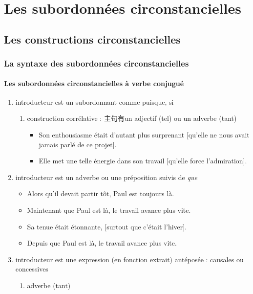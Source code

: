 \documentclass[UTF8]{report}
\begin{document}
\chapter{Les subordonnées circonstancielles}
\section{Les constructions circonstancielles}
\subsection{La syntaxe des subordonnées circonstancielles}
\subsubsection{Les subordonnées circonstancielles à verbe conjugué}
\begin{enumerate}
    \item introducteur est un subordonnant comme puisque, si
    \begin{enumerate}
        \item construction corrélative : 主句有un adjectif (tel) ou un adverbe (tant)
        \begin{itemize}
            \item Son enthousiasme était d’autant plus surprenant [qu’elle ne nous avait jamais parlé de ce projet].
            \item Elle met une telle énergie dans son travail [qu’elle force l’admiration].
        \end{itemize}
    \end{enumerate}
    \item introducteur est un adverbe ou une préposition suivis de \textit{que} 
    \begin{itemize}
        \item Alors qu’il devait partir tôt, Paul est toujours là.
        \item Maintenant que Paul est là, le travail avance plus vite.
        \item Sa tenue était étonnante, [surtout que c’était l’hiver].
        \item Depuis que Paul est là, le travail avance plus vite.
    \end{itemize}
    \item introducteur est une expression (en fonction extrait) antéposée : causales ou concessives
    \begin{enumerate}
        \item adverbe (tant)

\end{enumerate}
\end{enumerate}
\end{document}
